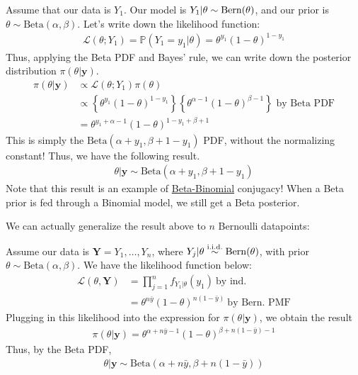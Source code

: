 \documentclass[12pt]{article}
\newcommand{\Bern}{\textnormal{Bern}}
\newcommand{\Prob}{\mathbb{P}}
\begin{document}
\medskip

\begin{tcolorbox}[breakable, title = \textbf{Example 9.2.3 in textbook}: Single Bernoulli trial with Beta prior]
    Assume that our data is $Y_1$. Our model is $Y_1|\theta \sim \Bern(\theta)$, and our prior is $\theta \sim \text{Beta}(\alpha,\beta)$. Let's write down the likelihood function:
    \begin{align*}
        \mathcal{L}(\theta;Y_1) = \Prob(Y_1 = y_1|\theta)= \theta^{y_1}(1-\theta)^{1-y_1}
    \end{align*}
    Thus, applying the Beta PDF and Bayes' rule, we can write down the posterior distribution $\pi(\theta|\textbf{y})$.
    \begin{align*}
        \pi(\theta|\textbf{y}) 
        &\propto \mathcal{L}(\theta;Y_1)\pi(\theta) \\
        &\propto \left\{\theta^{y_1}(1-\theta)^{1-y_1}\right\}\left\{\theta^{\alpha-1}(1-\theta)^{\beta-1}\right\} \text{ by Beta PDF}\\
        &= \theta^{y_1 +\alpha -1}(1-\theta)^{1-y_1+\beta+1}
    \end{align*}
    This is simply the $\text{Beta}(\alpha +y_1, \beta + 1 - y_1)$ PDF, without the normalizing constant! Thus, we have the following result.
    \begin{align*}
        \boxed{\theta|\textbf{y}\sim \text{Beta}(\alpha + y_1, \beta + 1 - y_1)}
    \end{align*}
    Note that this result is an example of \underline{Beta-Binomial} conjugacy! When a Beta prior is fed through a Binomial model, we still get a Beta posterior.
\end{tcolorbox}

\medskip

\noindent We can actually generalize the result above to $n$ Bernoulli datapoints:

\medskip

\begin{tcolorbox}[breakable, title= \textbf{Example 9.2.3 in textbook (cont.)}: $n$ ind. Bernoulli trials with Beta prior]
    Assume our data is $\textbf{Y} = Y_1,\dots,Y_n$, where $Y_j |\theta\overset{\text{i.i.d.}}{\sim} \Bern(\theta)$, with prior $\theta \sim \text{Beta}(\alpha, \beta)$.
    We have the likelihood function below:
    \begin{align*}
        \mathcal{L}(\theta, \textbf{Y}) 
        &= \prod_{j=1}^{n}f_{Y_1|\theta}(y_1) \ \text{by ind.}\\
        &= \theta^{n\bar{y}}(1-\theta)^{n(1-\bar{y})} \ \text{by Bern. PMF}
    \end{align*}
    Plugging in this likelihood into the expression for $\pi(\theta|\textbf{y})$, we obtain the result
    \begin{align*}
        \pi(\theta|\textbf{y}) = \theta^{\alpha+n\bar{y}-1 }(1-\theta)^{\beta + n(1-\bar{y}) - 1}
    \end{align*}
    Thus, by the Beta PDF,
    \begin{align*}
        \boxed{\theta|\textbf{y} \sim \text{Beta}(\alpha +n\bar{y}, \beta + n(1-\bar{y}))}
    \end{align*}
\end{tcolorbox}
\end{document}
